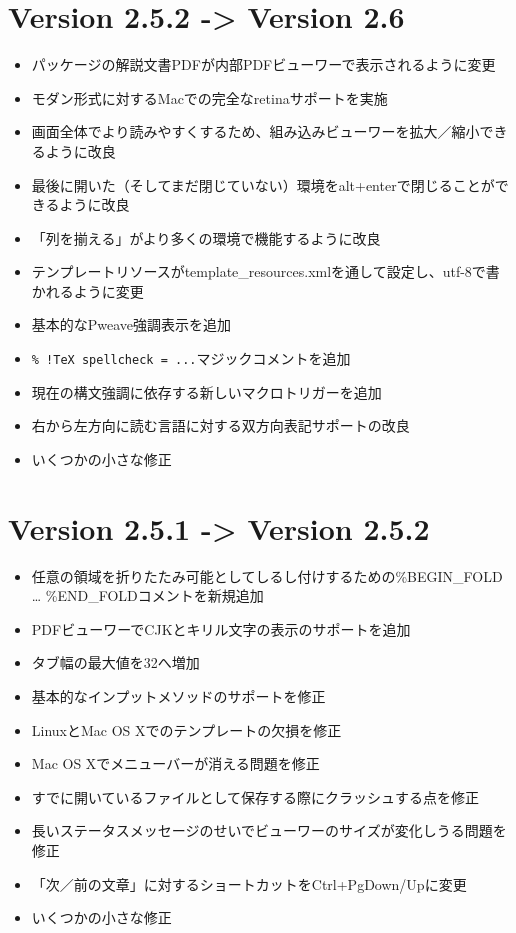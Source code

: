 \documentclass[]{book}
\begin{document}
\section{Version 2.5.2 -\textgreater{} Version 2.6}

\begin{itemize}
\item
  パッケージの解説文書PDFが内部PDFビューワーで表示されるように変更
\item
  モダン形式に対するMacでの完全なretinaサポートを実施
\item
  画面全体でより読みやすくするため、組み込みビューワーを拡大／縮小できるように改良
\item
  最後に開いた（そしてまだ閉じていない）環境をalt+enterで閉じることができるように改良
\item
  「列を揃える」がより多くの環境で機能するように改良
\item
  テンプレートリソースがtemplate\_resources.xmlを通して設定し、utf-8で書かれるように変更
\item
  基本的なPweave強調表示を追加
\item
  \lstinline"% !TeX spellcheck = ..."マジックコメントを追加
\item
  現在の構文強調に依存する新しいマクロトリガーを追加
\item
  右から左方向に読む言語に対する双方向表記サポートの改良
\item
  いくつかの小さな修正
\end{itemize}

\section{Version 2.5.1 -\textgreater{} Version 2.5.2}

\begin{itemize}
\item
  任意の領域を折りたたみ可能としてしるし付けするための\%BEGIN\_FOLD
  \ldots{} \%END\_FOLDコメントを新規追加
\item
  PDFビューワーでCJKとキリル文字の表示のサポートを追加
\item
  タブ幅の最大値を32へ増加
\item
  基本的なインプットメソッドのサポートを修正
\item
  LinuxとMac OS Xでのテンプレートの欠損を修正
\item
  Mac OS Xでメニューバーが消える問題を修正
\item
  すでに開いているファイルとして保存する際にクラッシュする点を修正
\item
  長いステータスメッセージのせいでビューワーのサイズが変化しうる問題を修正
\item
  「次／前の文章」に対するショートカットをCtrl+PgDown/Upに変更
\item
  いくつかの小さな修正
\end{itemize}
\end{document}
